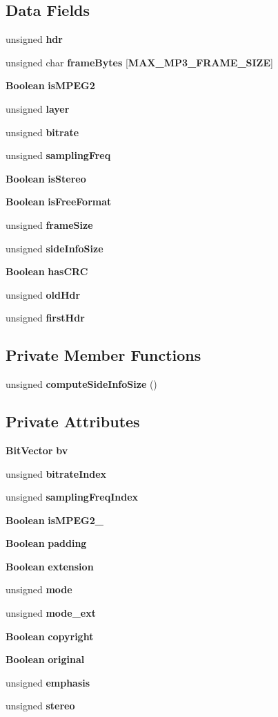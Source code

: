 \subsection*{Data Fields}
\begin{DoxyCompactItemize}
\item 
unsigned {\bf hdr}
\item 
unsigned char {\bf frame\+Bytes} [{\bf M\+A\+X\+\_\+\+M\+P3\+\_\+\+F\+R\+A\+M\+E\+\_\+\+S\+I\+Z\+E}]
\item 
{\bf Boolean} {\bf is\+M\+P\+E\+G2}
\item 
unsigned {\bf layer}
\item 
unsigned {\bf bitrate}
\item 
unsigned {\bf sampling\+Freq}
\item 
{\bf Boolean} {\bf is\+Stereo}
\item 
{\bf Boolean} {\bf is\+Free\+Format}
\item 
unsigned {\bf frame\+Size}
\item 
unsigned {\bf side\+Info\+Size}
\item 
{\bf Boolean} {\bf has\+C\+R\+C}
\item 
unsigned {\bf old\+Hdr}
\item 
unsigned {\bf first\+Hdr}
\end{DoxyCompactItemize}
\subsection*{Private Member Functions}
\begin{DoxyCompactItemize}
\item 
unsigned {\bf compute\+Side\+Info\+Size} ()
\end{DoxyCompactItemize}
\subsection*{Private Attributes}
\begin{DoxyCompactItemize}
\item 
{\bf Bit\+Vector} {\bf bv}
\item 
unsigned {\bf bitrate\+Index}
\item 
unsigned {\bf sampling\+Freq\+Index}
\item 
{\bf Boolean} {\bf is\+M\+P\+E\+G2\+\_}
\item 
{\bf Boolean} {\bf padding}
\item 
{\bf Boolean} {\bf extension}
\item 
unsigned {\bf mode}
\item 
unsigned {\bf mode\+\_\+ext}
\item 
{\bf Boolean} {\bf copyright}
\item 
{\bf Boolean} {\bf original}
\item 
unsigned {\bf emphasis}
\item 
unsigned {\bf stereo}
\end{DoxyCompactItemize}


